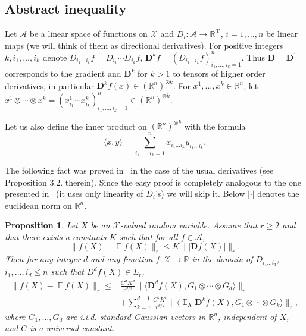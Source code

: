 \documentclass[a4paper]{amsart}
\newtheorem{proposition}[theorem]{Proposition} %
\theoremstyle{definition}
\theoremstyle{remark}
\numberwithin{equation}{section}
\newcommand*{\RR}{\mathbb{R}}
\DeclareMathOperator{\EE}{\mathbb{E}} %
\newcommand*{\abs}[1]{\left\vert #1 \right\vert}
\begin{document}
\subsection{Abstract inequality}
Let $\mathcal{A}$ be a linear space of functions on $\mathcal{X}$ and $D_i \colon \mathcal{A} \to \RR^\mathcal{X}$, $i = 1,\ldots,n$ be linear maps (we will think of them as directional derivatives). For positive integers $k, i_1,\ldots,i_k$ denote $D_{i_1\ldots i_k} f = D_{i_1}\cdots D_{i_k} f$, $\mathbf{D}^k f = (D_{i_1\ldots i_k} f)_{i_1,\ldots,i_k=1}^n$. Thus $\mathbf{D} = \mathbf{D}^1$ corresponds to the gradient and $\mathbf{D}^k$ for $k > 1$ to tensors of higher order derivatives, in particular $\mathbf{D}^k f(x) \in (\RR^n)^{\otimes k}$. For $x^1,\ldots,x^k \in \RR^n$, let $x^1\otimes\cdots \otimes x^k = (x^1_{i_1}\cdots x^k_{i_k})_{i_1,\ldots,i_k=1}^n \in (\RR^n)^{\otimes k}$.

Let us also define the inner product on $(\RR^n)^{\otimes k}$ with the formula
\begin{displaymath}
  \langle x, y\rangle = \sum_{i_1,\ldots,i_k = 1}^n x_{i_1\ldots i_k}y_{i_1\ldots i_k}.
\end{displaymath}

The following fact was proved in~\cite{MR3383337} in the case of the usual derivatives (see Proposition 3.2. therein). Since the easy proof is completely analogous to the one presented in~\cite{MR3383337} (it uses only linearity of $D_i$'s) we will skip it.
Below $\abs{\cdot}$ denotes the euclidean norm on $\RR^n$.

\begin{proposition}\label{prop:higher-order-moments} Let $X$ be an $\mathcal{X}$-valued random variable.  
Assume that $r \ge 2$ and that there exists a constants $K$ such that for all $f \in \mathcal{A}$,
\begin{displaymath}
  \|f(X) - \EE f(X)\|_r \le K\Big\||\mathbf{D} f(X)|\Big\|_r.
\end{displaymath}
Then for any integer $d$ and any function $f\colon \mathcal{X} \to \RR$ in the domain of $D_{i_1\ldots i_d}$, $i_1,\ldots,i_d \le n$ such that $D^df(X)\in L_r$,
\begin{align*}
  \| f(X) - \EE f(X)\|_r \le&  \frac{C^d K^d}{r^{d/2}}\| \langle \mathbf{D}^d f(X),G_1\otimes\cdots\otimes G_d\rangle\|_r \\
  &+ \sum_{k=1}^{d-1} \frac{C^k K^k}{r^{k/2}}\| \langle \EE_X \mathbf{D}^k f(X),G_1\otimes\cdots\otimes G_k\rangle\|_r,
\end{align*}
where $G_1,\ldots,G_d$ are i.i.d. standard Gaussian vectors in $\RR^n$, independent of $X$,
 and $C$ is a universal constant.
\end{proposition}
\end{document}
